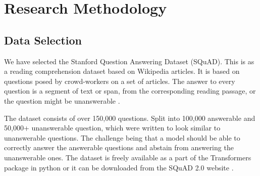 \documentclass[a4paper,12pt]{report}
\begin{document}





    \chapter{Research Methodology}\label{c3researchmeth}



    \section{Data Selection}\label{c31}

    	We have selected the Stanford Question Answering Dataset (SQuAD). This is as a reading comprehension dataset based on Wikipedia articles. It is based on questions posed by crowd-workers on a set of articles. The answer to every question is a segment of text or span, from the corresponding reading passage, or the question might be unanswerable \citep{dataset}.

    	The dataset consists of over 150,000 questions. Split into 100,000 answerable and 50,000+ unanswerable question, which were written to look similar to unanswerable questions. The challenge being that a model should be able to correctly answer the answerable questions and abstain from answering the unanswerable ones.
	    The dataset is freely available as a part of the Transformers package in python or it can be downloaded from the SQuAD 2.0 website \citep{squad}.
\end{document}
